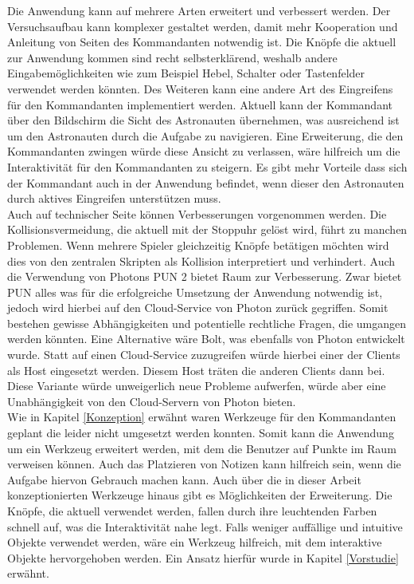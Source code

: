 Die Anwendung kann auf mehrere Arten erweitert und verbessert werden. Der Versuchsaufbau kann komplexer gestaltet werden, damit mehr Kooperation und Anleitung von Seiten des Kommandanten notwendig ist. Die Knöpfe die aktuell zur Anwendung kommen sind recht selbsterklärend, weshalb andere Eingabemöglichkeiten wie zum Beispiel Hebel, Schalter oder Tastenfelder verwendet werden könnten. Des Weiteren kann eine andere Art des Eingreifens für den Kommandanten implementiert werden. Aktuell kann der Kommandant über den Bildschirm die Sicht des Astronauten übernehmen, was ausreichend ist um den Astronauten durch die Aufgabe zu navigieren. Eine Erweiterung, die den Kommandanten zwingen würde diese Ansicht zu verlassen, wäre hilfreich um die Interaktivität für den Kommandanten zu steigern. Es gibt mehr Vorteile dass sich der Kommandant auch in der Anwendung befindet, wenn dieser den Astronauten durch aktives Eingreifen unterstützen muss.\\

Auch auf technischer Seite können Verbesserungen vorgenommen werden. Die Kollisionsvermeidung, die aktuell mit der Stoppuhr gelöst wird, führt zu manchen Problemen. Wenn mehrere Spieler gleichzeitig Knöpfe betätigen möchten wird dies von den zentralen Skripten als Kollision interpretiert und verhindert. Auch die Verwendung von Photons PUN 2 bietet Raum zur Verbesserung. Zwar bietet PUN alles was für die erfolgreiche Umsetzung der Anwendung notwendig ist, jedoch wird hierbei auf den Cloud-Service von Photon zurück gegriffen. Somit bestehen gewisse Abhängigkeiten und potentielle rechtliche Fragen, die umgangen werden könnten. Eine Alternative wäre Bolt, was ebenfalls von Photon entwickelt wurde. Statt auf einen Cloud-Service zuzugreifen würde hierbei einer der Clients als Host eingesetzt werden. Diesem Host träten die anderen Clients dann bei. Diese Variante würde unweigerlich neue Probleme aufwerfen, würde aber eine Unabhängigkeit von den Cloud-Servern von Photon bieten.\\

Wie in Kapitel \ref{Konzeption} erwähnt waren Werkzeuge für den Kommandanten geplant die leider nicht umgesetzt werden konnten. Somit kann die Anwendung um ein Werkzeug erweitert werden, mit dem die Benutzer auf Punkte im Raum verweisen können. Auch das Platzieren von Notizen kann hilfreich sein, wenn die Aufgabe hiervon Gebrauch machen kann. Auch über die in dieser Arbeit konzeptionierten Werkzeuge hinaus gibt es Möglichkeiten der Erweiterung. Die Knöpfe, die aktuell verwendet werden, fallen durch ihre leuchtenden Farben schnell auf, was die Interaktivität nahe legt. Falls weniger auffällige und intuitive Objekte verwendet werden, wäre ein Werkzeug hilfreich, mit dem interaktive Objekte hervorgehoben werden. Ein Ansatz hierfür wurde in Kapitel \ref{Vorstudie} erwähnt.
